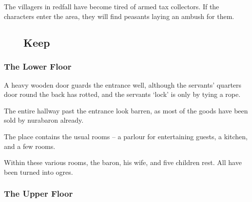 
\subsection{}
\vspace{-1cm}

\label{redfall_map}


The villagers in \gls{redfall} have become tired of armed tax collectors.  If the characters enter the area, they will find peasants laying an ambush for them.

\begin{figure}
	\subsection{ Keep}
\vspace{-2cm}

\label{redfall_keep_map}

\end{figure}

\subsubsection{The Lower Floor}

A heavy wooden door guards the entrance well, although the servants' quarters door round the back has rotted, and the servants `lock' is only by tying a rope.

The entire hallway past the entrance look barren, as most of the goods have been sold by \gls{nurabaron} already.

The place contains the usual rooms -- a parlour for entertaining guests, a kitchen, and a few rooms.

Within these various rooms, the baron, his wife, and five children rest.  All have been turned into ogres.


\ogre


\deephobgoblin


\subsubsection{The Upper Floor}

